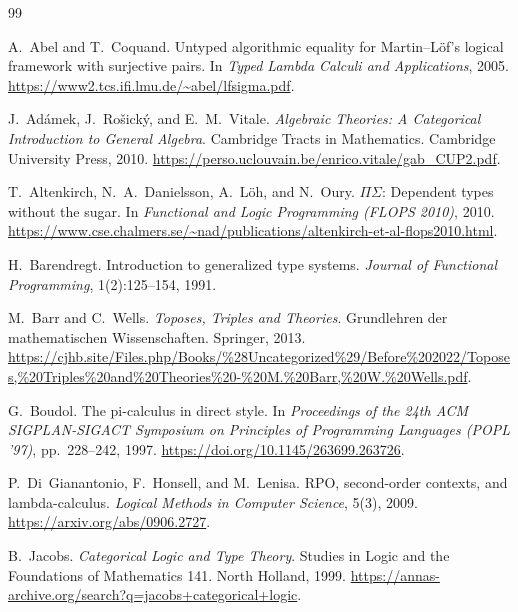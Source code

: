 \documentclass[11pt]{article}
\theoremstyle{definition}
\theoremstyle{plain}
\theoremstyle{remark}
\theoremstyle{plain}
\begin{document}
\begin{thebibliography}{99}

A.~Abel and T.~Coquand.
\newblock Untyped algorithmic equality for {M}artin--L\"of's logical framework with surjective pairs.
\newblock In \emph{Typed Lambda Calculi and Applications}, 2005.
\newblock \url{https://www2.tcs.ifi.lmu.de/~abel/lfsigma.pdf}.

J.~Ad\'amek, J.~Ro\v{s}ick\'y, and E.~M.~Vitale.
\newblock \emph{Algebraic Theories: A Categorical Introduction to General Algebra}.
\newblock Cambridge Tracts in Mathematics. Cambridge University Press, 2010.
\newblock \url{https://perso.uclouvain.be/enrico.vitale/gab_CUP2.pdf}.

T.~Altenkirch, N.~A.~Danielsson, A.~L\"oh, and N.~Oury.
\newblock $\Pi\Sigma$: Dependent types without the sugar.
\newblock In \emph{Functional and Logic Programming (FLOPS 2010)}, 2010.
\newblock \url{https://www.cse.chalmers.se/~nad/publications/altenkirch-et-al-flops2010.html}.

H.~Barendregt.
\newblock Introduction to generalized type systems.
\newblock \emph{Journal of Functional Programming}, 1(2):125--154, 1991.

M.~Barr and C.~Wells.
\newblock \emph{Toposes, Triples and Theories}.
\newblock Grundlehren der mathematischen Wissenschaften. Springer, 2013.
\newblock \url{https://cjhb.site/Files.php/Books/%28Uncategorized%29/Before%202022/Toposes,%20Triples%20and%20Theories%20-%20M.%20Barr,%20W.%20Wells.pdf}.

G.~Boudol.
\newblock The pi-calculus in direct style.
\newblock In \emph{Proceedings of the 24th ACM SIGPLAN-SIGACT Symposium on Principles of Programming Languages (POPL '97)},
pp.~228--242, 1997.
\newblock \url{https://doi.org/10.1145/263699.263726}.

P.~Di~Gianantonio, F.~Honsell, and M.~Lenisa.
\newblock RPO, second-order contexts, and lambda-calculus.
\newblock \emph{Logical Methods in Computer Science}, 5(3), 2009.
\newblock \url{https://arxiv.org/abs/0906.2727}.

B.~Jacobs.
\newblock \emph{Categorical Logic and Type Theory}.
\newblock Studies in Logic and the Foundations of Mathematics 141. North Holland, 1999.
\newblock \url{https://annas-archive.org/search?q=jacobs+categorical+logic}.


\end{thebibliography}
\end{document}
